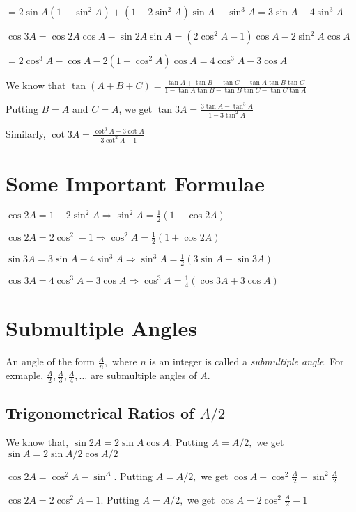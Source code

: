 \noindent $= 2\sin A(1 - \sin^2A) + (1 - 2\sin^2A)\sin A - \sin^3A = 3\sin A - 4\sin^3A$

\noindent $\cos 3A = \cos2A\cos A - \sin 2A\sin A = (2\cos^2A - 1)\cos A - 2\sin^2 A\cos A$

\noindent $= 2\cos^3A - \cos A - 2(1 - \cos^2A)\cos A = 4\cos^3 A - 3\cos A$

\noindent We know that $\tan(A + B + C) = \frac{\tan A + \tan B + \tan C - \tan A\tan B\tan C}{1 - \tan A\tan B - \tan B\tan C -
  \tan C\tan A}$

\noindent Putting $B = A$ and $C = A$, we get $\tan 3A = \frac{3\tan A - \tan^3A}{1 - 3\tan^2A}$

\noindent Similarly, $\cot 3A = \frac{\cot^3 A - 3\cot A}{3\cot^2A - 1}$

\section{Some Important Formulae}
\startitemize[n]
\item $\cos2A = 1 - 2\sin^2A \Rightarrow \sin^2A = \frac{1}{2}(1 - \cos2A)$
\item $\cos2A = 2\cos^2 - 1 \Rightarrow \cos^2A = \frac{1}{2}(1 + \cos2A)$
\item $\sin 3A = 3\sin A - 4\sin^3A \Rightarrow \sin^3A = \frac{1}{2}(3\sin A - \sin3A)$
\item $\cos 3A = 4\cos^3A - 3\cos A \Rightarrow \cos^3A = \frac{1}{4}(\cos3A + 3\cos A)$
\stopitemize

\section{Submultiple Angles}
An angle of the form $\frac{A}{n},$ where $n$ is an integer is called a {\it submultiple angle}. For exmaple,
$\frac{A}{2}, \frac{A}{3}, \frac{A}{4}, \ldots$ are submultiple angles of $A.$

\subsection{Trigonometrical Ratios of $A/2$}
We know that, $\sin 2A = 2\sin A\cos A.$ Putting $A=A/2,$ we get $\sin A = 2\sin A/2\cos A/2$

\noindent $\cos 2A = \cos^2A - \sin^A.$ Putting $A = A/2,$ we get $\cos A - \cos^2\frac{A}{2} - \sin^2\frac{A}{2}$

\noindent $\cos 2A = 2\cos^2A - 1.$ Putting $A = A/2,$ we get $\cos A = 2\cos^2\frac{A}{2} - 1$

